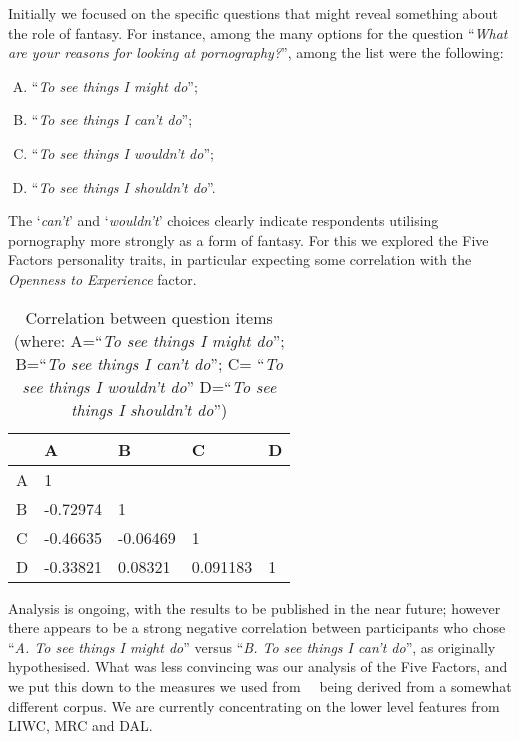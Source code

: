 \documentclass[letterpaper]{article}
\begin{document}
Initially we focused on the specific questions that might reveal
something about the role of fantasy. For instance, among the many
options for the question ``{\emph{What are your reasons for looking at
pornography?}}'', among the list were the following:

\begin{enumerate}[(A)]
\item ``{\emph{To see things I might do}}'';
\item ``{\emph{To see things I can't do}}'';
\item ``{\emph{To see things I wouldn't do}}'';
\item ``{\emph{To see things I shouldn't do}}''. 
\end{enumerate}

The `{\emph{can't}}' and `{\emph{wouldn't}}' choices clearly indicate
respondents utilising pornography more strongly as a form of
fantasy. For this we explored the Five Factors personality traits, in
particular expecting some correlation with the {\emph{Openness to
Experience}} factor.

\begin{table}[!htb]
\centering
\begin{tabularx}{\columnwidth}{l Y Y Y Y}
\hline
& A & B & C & D\\ 
\hline
A & 1 &  & & \\
B & -0.72974 & 1 & & \\
C & -0.46635 & -0.06469 & 1 & \\
D & -0.33821 & 0.08321 & 0.091183 & 1\\
\hline
\end{tabularx}
\caption{Correlation between question items (where: A=``{\emph{To
see things I might do}}''; B=``{\emph{To see things I can't do}}''; C=
``{\emph{To see things I wouldn't do}}'' D=``{\emph{To see
things I shouldn't do}}'')}
\label{tbl:abcd}
\end{table}

Analysis is ongoing, with the results to be published in the near
future; however there appears to be a strong negative correlation
between participants who chose ``{\emph{A. To see things I might
do}}'' versus ``{\emph{B. To see things I can't do}}'', as originally
hypothesised. What was less convincing was our analysis of the Five
Factors, and we put this down to the measures we used
from~\citeauthor{mairesse-et-al:2007}~
being derived from a somewhat different corpus. We are currently
concentrating on the lower level features from LIWC, MRC and DAL.
\end{document}
